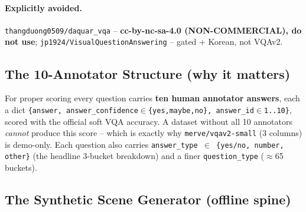 \documentclass[12pt,a4paper]{article}
\begin{document}
\paragraph{Explicitly avoided.} \texttt{thangduong0509/daquar\_vqa} -- \textbf{cc-by-nc-sa-4.0 (NON-COMMERCIAL), do not use}; \texttt{jp1924/VisualQuestionAnswering} -- gated + Korean, not VQAv2.

\subsection{The 10-Annotator Structure (why it matters)}

For proper scoring every question carries \textbf{ten human annotator answers}, each a dict \texttt{\{answer, answer\_confidence$\in$\{yes,maybe,no\}, answer\_id$\in$1..10\}}, scored with the official soft VQA accuracy. A dataset without all 10 annotators \emph{cannot} produce this score -- which is exactly why \texttt{merve/vqav2-small} (3 columns) is demo-only. Each question also carries \texttt{answer\_type $\in$ \{yes/no, number, other\}} (the headline 3-bucket breakdown) and a finer \texttt{question\_type} ($\approx$65 buckets).

\subsection{The Synthetic Scene Generator (offline spine)}
\end{document}
